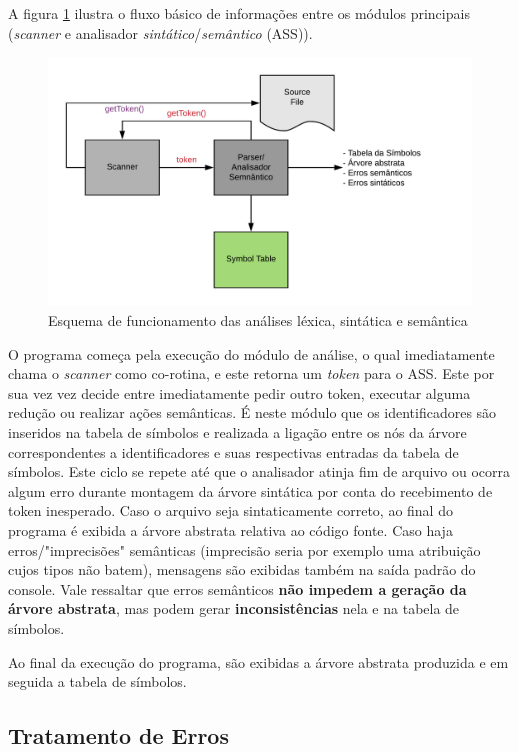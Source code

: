 \documentclass[
	article,			%
	11pt,				%
	oneside,			%
	a4paper,			%
	english,			%
	brazil,				%
	sumario=tradicional
	]{abntex2}
\renewcommand{\it}[1]{\textit{#1}}
\renewcommand{\bf}[1]{\textbf{#1}}
\begin{document}
A figura \ref{esquema} ilustra o fluxo básico de informações entre os módulos principais (\it{scanner} e analisador \it{sintático}/\it{semântico} (ASS)).

\begin{figure}[hbt!]
	\caption{Esquema de funcionamento das análises léxica, sintática e semântica}
	\label{esquema}
	\centering
	\includegraphics[scale=0.8]{img/diagrama-tradutores.png}
\end{figure}

O programa começa pela execução do módulo de análise, o qual imediatamente chama o \it{scanner} como co-rotina, e este retorna um \it{token} para o ASS. Este por sua vez vez decide entre
imediatamente pedir outro token, executar alguma redução ou realizar ações semânticas. É neste módulo que os identificadores são inseridos na tabela
de símbolos e realizada a ligação entre os nós da árvore correspondentes a identificadores e suas respectivas entradas da tabela de símbolos. Este ciclo se repete até que o analisador atinja fim de arquivo
ou ocorra algum erro durante montagem da árvore sintática por conta do recebimento de
token inesperado. Caso o arquivo seja sintaticamente correto, ao final do programa é exibida a árvore abstrata relativa ao código fonte. Caso haja erros/"imprecisões" semânticas (imprecisão seria por exemplo uma atribuição cujos tipos não batem), mensagens são exibidas também na saída padrão do console. Vale ressaltar que erros semânticos \bf{não impedem a geração da árvore abstrata}, mas podem gerar \bf{inconsistências} nela e na tabela de símbolos.

Ao final da execução do programa, são exibidas a árvore abstrata produzida e em seguida a tabela de símbolos.

\subsection{Tratamento de Erros}
\end{document}
